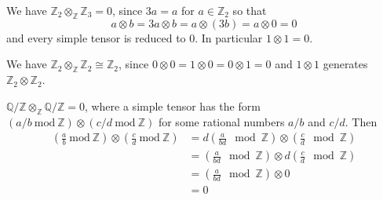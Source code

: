 \begin{example}
We have $\mathbb{Z}_{2}\otimes_{\mathbb{Z}}\mathbb{Z}_{3}=0$, since $3a=a$ for $a\in \mathbb{Z}_{2}$ so that
\[
a\otimes b=3a\otimes b=a\otimes (3b)=a\otimes 0=0
\]
and every simple tensor is reduced to 0. In particular $1\otimes1=0$.
\end{example}
\begin{example}
We have $\mathbb{Z}_{2}\otimes_{\mathbb{Z}}\mathbb{Z}_{2}\cong \mathbb{Z}_{2}$, since $0\otimes0=1\otimes0=0\otimes1=0$ and $1\otimes1$ generates $\mathbb{Z}_{2}\otimes \mathbb{Z}_{2}$.
\end{example}
\begin{example}
$\mathbb{Q}/\mathbb{Z}\otimes_{\mathbb{Z}}\mathbb{Q}/\mathbb{Z}=0$, where a simple tensor has the form $(a/b\ \mathrm{mod}\ \mathbb{Z})\otimes(c/d \ \mathrm{mod}\ \mathbb{Z})$ for some rational numbers $a/b$ and $c/d$. Then
\begin{equation}
\begin{aligned}
\left( \frac{a}{b}\ \mathrm{mod}\ \mathbb{Z} \right)\otimes \left( \frac{c}{d}\ \mathrm{mod}\ \mathbb{Z} \right) & =d\left( \frac{a}{bd}\mod\mathbb{Z} \right)\otimes \left( \frac{c}{d}\mod\mathbb{Z} \right) \\
 & =\left( \frac{a}{bd}\mod\mathbb{Z} \right)\otimes d\left( \frac{c}{d}\mod\mathbb{Z} \right) \\
 & =\left( \frac{a}{bd}\mod\mathbb{Z} \right)\otimes 0 \\
 & =0
\end{aligned}
\label{d2f1db}
\end{equation}
\end{example}

